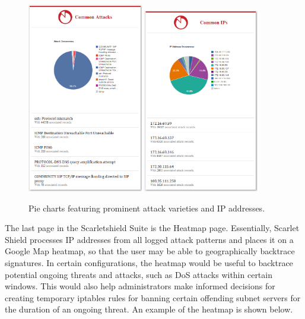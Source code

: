 \documentclass[11.5pt,letterpaper,titlepage]{report}
\begin{document}
\begin{figure}[h]
\centering
\includegraphics[width=0.45\textwidth]{attackpie.png}\hfill
\includegraphics[width=0.45\textwidth]{ippie.png}
\caption{Pie charts featuring prominent attack varieties and IP addresses.}
\end{figure}

The last page in the Scarletshield Suite is the Heatmap page. Essentially,
Scarlet Shield processes IP addresses from all logged attack patterns and places
it on a Google Map heatmap, so that the user may be able to geographically
backtrace signatures.  In certain configurations, the heatmap would be useful to
backtrace potential ongoing threats and attacks, such as DoS attacks within
certain windows.  This would also help administrators make informed decisions
for creating temporary iptables rules for banning certain offending subnet
servers for the duration of an ongoing threat. An example of the heatmap is
shown below. 
\end{document}
